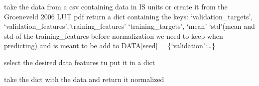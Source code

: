 \documentclass[letterpaper,10pt,english]{sphinxmanual}
\begin{document}
\begin{fulllineitems}
\begin{fulllineitems}
\end{fulllineitems}


\begin{fulllineitems}
\label{\detokenize{CHF_model_api:CHF_model_api.dataBase.MyDB.loadData}}
\pysigstartsignatures
{}
\pysigstopsignatures
\sphinxAtStartPar
take the data from a csv containing data in IS units
or create it from the Groeneveld 2006 LUT pdf
return a dict containing the keys:
‘validation\_targets’, ‘validation\_features’,’training\_features’
‘training\_targets’, ‘mean’ ‘std’(mean and std of the 
training\_features before normalization we need to keep when
predicting) and is meant to be add to DATA{[}seed{]} = \{‘validation’:…\}

\end{fulllineitems}


\begin{fulllineitems}
\label{\detokenize{CHF_model_api:CHF_model_api.dataBase.MyDB.makeDictDatabase}}
\pysigstartsignatures
{}
\pysigstopsignatures
\sphinxAtStartPar
select the desired data features tu put it in a dict

\end{fulllineitems}


\begin{fulllineitems}
\label{\detokenize{CHF_model_api:CHF_model_api.dataBase.MyDB.normalizeData}}
\pysigstartsignatures
{}
\pysigstopsignatures
\sphinxAtStartPar
take the dict with the data and return it
normalized

\end{fulllineitems}


\end{fulllineitems}
\end{document}
